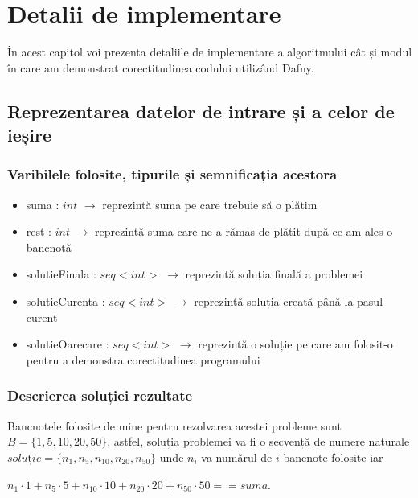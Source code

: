 
\chapter{Detalii de implementare}
În acest capitol voi prezenta detaliile de implementare a algoritmului cât și modul în care am demonstrat corectitudinea codului utilizând Dafny.
\section{Reprezentarea datelor de intrare și a celor de ieșire}

\subsection{Varibilele folosite, tipurile și semnificația acestora}

\begin{itemize}
	\item suma : $int$ $\rightarrow$ reprezintă suma pe care trebuie să o plătim 
	\item rest : $int$ $\rightarrow$ reprezintă suma care ne-a rămas de plătit după ce am ales o bancnotă
	\item solutieFinala : $seq<int>$ $\rightarrow$ reprezintă soluția finală a problemei 
	\item solutieCurenta : $seq<int>$ $\rightarrow$ reprezintă soluția creată până la pasul curent
	\item solutieOarecare  : $seq<int>$ $\rightarrow$ reprezintă o soluție pe care am folosit-o pentru a demonstra corectitudinea programului
\end{itemize}

\subsection{Descrierea soluției rezultate}
Bancnotele folosite de mine pentru rezolvarea acestei probleme sunt \\ $B = \{1, 5, 10, 20, 50\}$, astfel, soluția problemei va fi o secvență de numere naturale $ soluție = \{n_1,n_5,n_{10},n_{20},n_{50} \}$ unde $n_i$ va numărul de $i$ bancnote folosite iar 
\begin{center}
	$n_1 \cdot 1 + n_5 \cdot 5 + n_{10} \cdot 10 + n_{20} \cdot 20 + n_{50} \cdot 50 == suma $.
\end{center}
\vspace{0.5cm}


